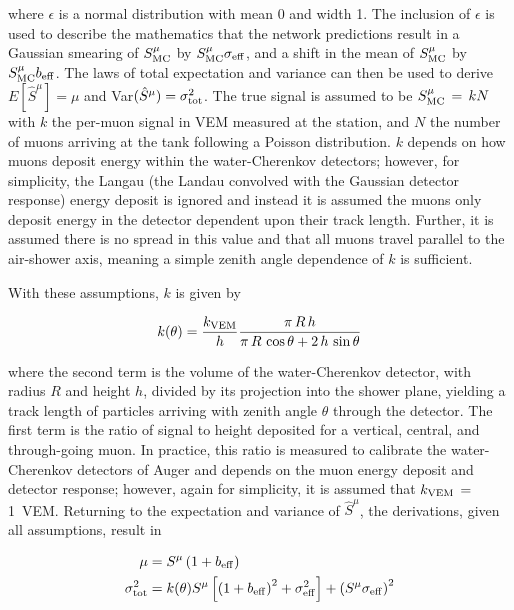 \noindent
where $\epsilon$ is a normal distribution with mean 0 and width 1.
The inclusion of $\epsilon$ is used to describe the mathematics that the network predictions result in a Gaussian smearing of $S^{\mu}_{\rm MC}$ by $S^{\mu}_{\rm MC}\sigma_{\rm eff}$, and a shift in the mean of $S^{\mu}_{\rm MC}$ by $S^{\mu}_{\rm MC}b_{\rm eff}$.
The laws of total expectation and variance can then be used to derive $E\left[\hat{S}^{\mu}\right]=\mu$ and Var$(\hat{S}^{\mu})=\sigma_{\rm tot}^{2}$.
The true signal is assumed to be $S^{\mu}_{\rm MC}\,=\,kN$ with $k$ the per-muon signal in VEM measured at the station, and $N$ the number of muons arriving at the tank following a Poisson distribution.
$k$ depends on how muons deposit energy within the water-Cherenkov detectors; however, for simplicity, the Langau (the Landau convolved with the Gaussian detector response) energy deposit is ignored and instead it is assumed the muons only deposit energy in the detector dependent upon their track length.
Further, it is assumed there is no spread in this value and that all muons travel parallel to the air-shower axis, meaning a simple zenith angle dependence of $k$ is sufficient.

With these assumptions, $k$ is given by

\begin{equation}
  k(\theta) = \frac{k_{\rm VEM}}{h} \frac{\pi\,R\,h}{\pi\,R\,\cos\theta + 2\,h\,\sin\theta} \label{eq:track_length}
\end{equation}

\noindent
where the second term is the volume of the water-Cherenkov detector, with radius $R$ and height $h$, divided by its projection into the shower plane, yielding a track length of particles arriving with zenith angle $\theta$ through the detector.
The first term is the ratio of signal to height deposited for a vertical, central, and through-going muon.
In practice, this ratio is measured to calibrate the water-Cherenkov detectors of Auger and depends on the muon energy deposit and detector response; however, again for simplicity, it is assumed that $k_{\rm VEM}\,=\,$\qty{1}{VEM}.
Returning to the expectation and variance of $\hat{S}^{\mu}$, the derivations, given all assumptions, result in

\begin{align}
  \mu &= S^{\mu}\left(1 + b_{\rm eff}\right) \label{eq:smu_expectation} \\
  \sigma_{\rm tot}^{2} &= k(\theta)S^{\mu}\left[\left(1 + b_{\rm eff}\right)^{2} + \sigma_{\rm eff}^{2}\right] + \left(S^{\mu}\sigma_{\rm eff}\right)^{2} \label{eq:smu_total_variance}
\end{align}

